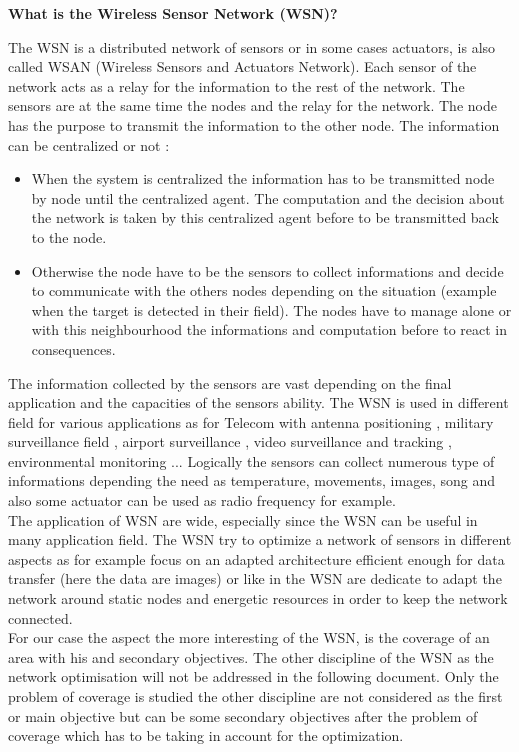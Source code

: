 \textbf{What is the Wireless Sensor Network (WSN)? }

 The WSN is a distributed network of sensors or in some cases actuators, is also called WSAN (Wireless Sensors and Actuators Network). Each sensor of the network acts as a relay for the information to the rest of the network.  
The sensors are at the same time the nodes and the relay for the network. The node has the purpose to transmit the information to the other node. 
The information can be centralized or not :
\begin{itemize}
\item When the system is centralized the information has to be transmitted node by node until the centralized agent. The computation and the decision about the network is taken by this centralized agent before to be transmitted back to the node. 
\item Otherwise the node have to be the sensors to collect informations and decide to communicate with the others nodes depending on the situation (example when the target is detected in their field). The nodes have to manage alone or with this neighbourhood the informations and computation before to react in consequences. 

\end{itemize}
 
The information collected by the sensors are vast depending on the final application and the capacities of the sensors ability. 
The WSN is used in different field for various applications as for Telecom with antenna positioning \cite{59*wang2008}, military surveillance field \cite{38*liu2010,101*topcuoglu2009}, airport surveillance \cite{37*ma2012}, video surveillance and tracking \cite{38*liu2010}, environmental monitoring \cite{42*bulusu2001}... 
Logically the sensors can collect numerous type of informations depending the need as temperature, movements, images, song and also some  actuator can be used as radio frequency for example.\\
 The application of WSN are wide, especially since the WSN can be useful in many application field. The WSN try to optimize a network of sensors in different aspects as for example \cite{39*wu2011} focus on an adapted architecture efficient enough for data transfer (here the data are images) or like in \cite{40*sohrabi2000} the WSN are dedicate to adapt the network around static nodes and energetic resources in order to keep the network connected.  \\
For our case the aspect the more interesting of the WSN, is the coverage of an area with his and secondary objectives.
 The other discipline of the WSN as the network optimisation will not be addressed in the following document. Only the problem of coverage is studied the other discipline are not considered as the first or main objective but can be some secondary objectives after the problem of coverage which has to be taking in account for the optimization. 

